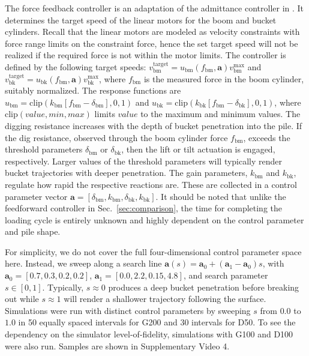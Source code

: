 \documentclass[10pt]{article}
\begin{document}
The force feedback controller is an adaptation of the 
admittance controller in \cite{Dobson2017}. It determines the target speed of the linear motors for the boom and 
bucket cylinders. Recall that the linear motors are modeled as velocity constraints with force range limits on the constraint force, hence the set target speed will not be realized if the required force is not within the motor limits. The controller is defined by the following target speeds: $v_\mathrm{bm}^\text{target} =  u_\mathrm{bm}(f_\mathrm{bm},\bm{a}) v_\mathrm{bm}^\text{max}$ 
and $v_\mathrm{bk}^\text{target} =  u_\mathrm{bk}(f_\mathrm{bm},\bm{a}) v_\mathrm{bk}^\text{max}$, where 
$f_\mathrm{bm}$ is the measured force in the boom cylinder, suitably normalized.
The response functions are $u_\mathrm{bm} = \text{clip}\left( k_\mathrm{bm}\left[ f_\mathrm{bm} -\delta_\mathrm{bm} \right],0,1\right)$ and $u_\mathrm{bk} = \text{clip}\left( k_\mathrm{bk}\left[ f_\mathrm{bm} -\delta_\mathrm{bk} \right],0,1\right)$, where $\text{clip}(value, min, max)$ limits $value$ to the maximum and minimum values.
The digging resistance increases with the depth of bucket penetration into the pile.
If the dig resistance, observed through the boom cylinder force $f_\mathrm{bm}$, exceeds the threshold parameters $\delta_\mathrm{bm}$ or $\delta_\mathrm{bk}$, then the lift or tilt actuation is engaged, respectively.
Larger values of the threshold parameters will typically render bucket trajectories with deeper penetration.
The gain parameters, $k_\mathrm{bm}$ and $k_\mathrm{bk}$, regulate how rapid the respective reactions are.
These are collected in a control parameter vector $\bm{a} = [\delta_\mathrm{bm}, k_\mathrm{bm}, \delta_\mathrm{bk}, k_\mathrm{bk}]$.
It should be noted that unlike the feedforward controller in Sec.~\ref{sec:comparison}, the
time for completing the loading cycle is entirely unknown and highly dependent on the control parameter
and pile shape.
 
For simplicity, we do not cover the full four-dimensional control parameter space here. Instead,
we sweep along a search line $\bm{a}(s) = \bm{a}_0 + (\bm{a}_1-\bm{a}_0)s$, 
with $\bm{a}_0 = [0.7, 0.3, 0.2, 0.2]$, $\bm{a}_1 = [0.0, 2.2, 0.15, 4.8]$, and search parameter $s \in [0,1]$.
Typically, $s \approx 0$ produces a deep bucket penetration before breaking out while $s\approx 1$
will render a shallower trajectory following the surface. 
Simulations were run with distinct control parameters by sweeping $s$ from $0.0$ to $1.0$ in 50 equally spaced
intervals for G200 and 30 intervals for D50.  To see the dependency on the simulator level-of-fidelity,
simulations with G100 and D100 were also run. Samples are shown in Supplementary Video 4.
\end{document}

